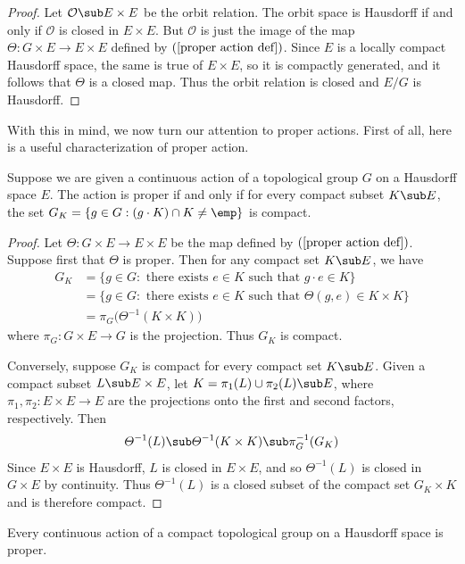 \begin{proof}
Let $\mathcal{O}\sub E\times E$ be the orbit relation. The orbit space is Hausdorff if and only if $\mathcal{O}$ is closed in $E\times E$. But $\mathcal{O}$ is just the image of the map $\varTheta:G\times E\to E\times E$ defined by $(\ref{proper action def})$. Since $E$ is a locally compact Hausdorff space, the same is true of $E\times E$, so it is compactly generated, and it follows that $\varTheta$ is a closed map. Thus the orbit relation is closed and $E/G$ is Hausdorff.
\end{proof}
With this in mind, we now turn our attention to proper actions. First of all, here is a 
useful characterization of proper action.
\begin{proposition}\label{proper action iff}
Suppose we are given a continuous action of a topological group $G$ on a Hausdorff space $E$. The action is proper if and only if for every compact subset $K\sub E$, the set $G_K=\{g\in G:(g\cdot K)\cap K\neq\emp\}$ is compact.
\end{proposition}
\begin{proof}
Let $\varTheta:G\times E\to E\times E$ be the map defined by $(\ref{proper action def})$. Suppose first that $\varTheta$ is proper. Then for any compact set $K\sub E$, we have
\begin{equation}\label{proper action iff-1}
\begin{aligned}
G_K&=\{g\in G:\text{ there exists }e\in K\text{ such that }g\cdot e\in K\}\\
&=\{g\in G:\text{ there exists }e\in K\text{ such that }\varTheta(g,e)\in K\times K\}\\
&=\pi_G\big(\varTheta^{-1}(K\times K)\big)
\end{aligned}
\end{equation}
where $\pi_G:G\times E\to G$ is the projection. Thus $G_K$ is compact.\par
Conversely, suppose $G_K$ is compact for every compact set $K\sub E$. Given a compact subset $L\sub E\times E$, let $K=\pi_1(L)\cup\pi_2(L)\sub E$, where $\pi_1,\pi_2:E\times E\to E$ are the projections onto the first and second factors, respectively. Then
\[\varTheta^{-1}(L)\sub\varTheta^{-1}(K\times K)\sub\pi_G^{-1}(G_K)\]
Since $E\times E$ is Hausdorff, $L$ is closed in $E\times E$, and so $\varTheta^{-1}(L)$ is closed in $G\times E$ by continuity. Thus $\varTheta^{-1}(L)$ is a closed subset of the compact set $G_K\times K$ and is therefore compact.
\end{proof}
\begin{corollary}
Every continuous action of a compact topological group on a Hausdorff space is proper.
\end{corollary}
